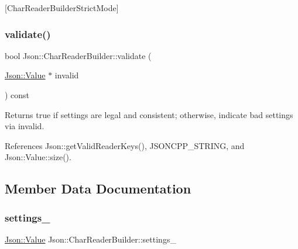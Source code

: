 \mbox{[}Char\+Reader\+Builder\+Strict\+Mode\mbox{]} \mbox{\label{classJson_1_1CharReaderBuilder_af890b5cb70e9b372e41de5c9e6535d21_af890b5cb70e9b372e41de5c9e6535d21}} 
\subsubsection{\texorpdfstring{validate()}{validate()}}
{\footnotesize\ttfamily bool Json\+::\+Char\+Reader\+Builder\+::validate (\begin{DoxyParamCaption}\item[{\hyperlink{classJson_1_1Value}{Json\+::\+Value} $\ast$}]{invalid }\end{DoxyParamCaption}) const}

\begin{DoxyReturn}{Returns}
true if \textquotesingle{}settings\textquotesingle{} are legal and consistent; otherwise, indicate bad settings via \textquotesingle{}invalid\textquotesingle{}. 
\end{DoxyReturn}


References Json\+::get\+Valid\+Reader\+Keys(), J\+S\+O\+N\+C\+P\+P\+\_\+\+S\+T\+R\+I\+NG, and Json\+::\+Value\+::size().



\subsection{Member Data Documentation}
\mbox{\label{classJson_1_1CharReaderBuilder_ac69b7911ad64c171c51ebaf2ea26d958_ac69b7911ad64c171c51ebaf2ea26d958}} 
\subsubsection{\texorpdfstring{settings\+\_\+}{settings\_}}
{\footnotesize\ttfamily \hyperlink{classJson_1_1Value}{Json\+::\+Value} Json\+::\+Char\+Reader\+Builder\+::settings\+\_\+}

